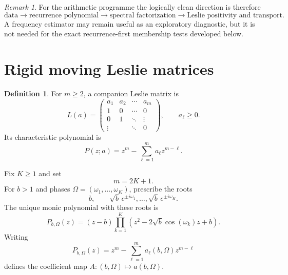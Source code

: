 \documentclass[11pt]{amsart}
\numberwithin{equation}{section}
\theoremstyle{plain}
\theoremstyle{definition}
\newtheorem{definition}[theorem]{Definition}
\theoremstyle{remark}
\newtheorem{remark}[theorem]{Remark}
\begin{document}
\begin{remark}
\label{rem:data_first_principle}
For the arithmetic programme the logically clean direction is therefore
\[
\text{data}\longrightarrow\text{recurrence polynomial}\longrightarrow\text{spectral factorization}\longrightarrow\text{Leslie positivity and transport}.
\]
A frequency estimator may remain useful as an exploratory diagnostic, but it is not needed for the exact recurrence-first membership tests developed below.
\end{remark}

\section{Rigid moving Leslie matrices}
\label{sec:rigid_moving_leslie}

\begin{definition}
\label{def:leslie_matrix}
For $m\geq2$, a companion Leslie matrix is
\begin{equation}
L(a)=
\begin{pmatrix}
a_1&a_2&\cdots&a_m\\
1&0&\cdots&0\\
0&1&\ddots&\vdots\\
\vdots&&\ddots&0
\end{pmatrix},
\qquad a_\ell\geq0.
\label{eq:leslie_matrix}
\end{equation}
Its characteristic polynomial is
\begin{equation}
P(z;a)=z^m-\sum_{\ell=1}^{m}a_\ell z^{m-\ell}.
\label{eq:characteristic_polynomial}
\end{equation}
\end{definition}

Fix $K\geq1$ and set
\begin{equation}
m=2K+1.
\label{eq:rigid_dimension}
\end{equation}
For $b>1$ and phases $\Omega=(\omega_1,\ldots,\omega_K)$, prescribe the roots
\begin{equation}
b,
\qquad
\sqrt b\,e^{\pm i\omega_1},\ldots,
\sqrt b\,e^{\pm i\omega_K}.
\label{eq:prescribed_roots}
\end{equation}
The unique monic polynomial with these roots is
\begin{equation}
P_{b,\Omega}(z)
=(z-b)\prod_{k=1}^{K}
\left(z^2-2\sqrt b\cos(\omega_k)z+b\right).
\label{eq:rigid_polynomial}
\end{equation}
Writing
\begin{equation}
P_{b,\Omega}(z)
=z^m-\sum_{\ell=1}^{m}a_\ell(b,\Omega)z^{m-\ell}
\label{eq:rigid_coefficients}
\end{equation}
defines the coefficient map $A:(b,\Omega)\mapsto a(b,\Omega)$.
\end{document}
